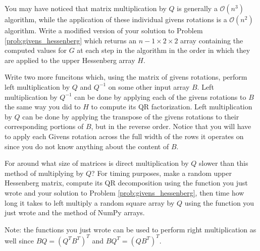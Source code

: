 \begin{problem}
\label{prob:givens_hessenberg_modified}
You may have noticed that matrix multiplication by $Q$ is generally a $\mathcal{O} \left( n^3 \right)$ algorithm, while the application of these individual givens rotations is a $\mathcal{O} \left( n^2 \right)$ algorithm.
Write a modified version of your solution to Problem \ref{prob:givens_hessenberg} which returns an $n-1 \times 2 \times 2$ array containing the computed values for $G$ at each step in the algorithm in the order in which they are applied to the upper Hessenberg array $H$.

Write two more funcitons which, using the matrix of givens rotations, perform left multiplication by $Q$ and $Q^{-1}$ on some other input array $B$.
Left multiplication by $Q^{-1}$ can be done by applying each of the givens rotations to $B$ the same way you did to $H$ to compute its QR factorization.
Left multiplication by $Q$ can be done by applying the transpose of the givens rotations to their corresponding portions of $B$, but in the reverse order.
Notice that you will have to apply each Givens rotation across the full width of the rows it operates on since you do not know anything about the content of $B$.

For around what size of matrices is direct multiplication by $Q$ slower than this method of multiplying by $Q$?
For timing purposes, make a random upper Hessenberg matrix, compute its QR decomposition using the function you just wrote and your solution to Problem \ref{prob:givens_hessenberg}, then time how long it takes to left multiply a random square array by $Q$ using the function you just wrote and the  method of NumPy arrays.

Note: the functions you just wrote can be used to perform right multiplication as well since $B Q = \left(Q^T B^T \right)^T$ and $B Q^T = \left( Q B^T \right)^T$.
\end{problem}
